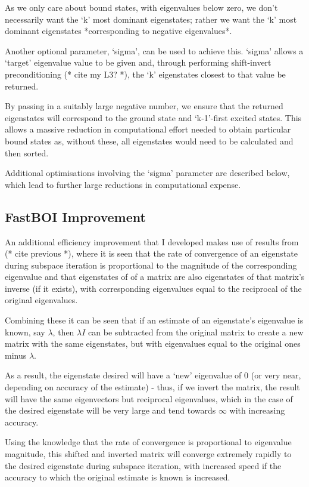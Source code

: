As we only care about bound states, with eigenvalues below zero, we don't necessarily want the `k' most dominant eigenstates; rather we want the `k' most dominant eigenstates *corresponding to negative eigenvalues*. 

Another optional parameter, `sigma', can be used to achieve this. `sigma' allows a `target' eigenvalue value to be given and, through performing shift-invert preconditioning (* cite my L3? *), the `k' eigenstates closest to that value be returned. 

By passing in a suitably large negative number, we ensure that the returned eigenstates will correspond to the ground state and `k-1'-first excited states. This allows a massive reduction in computational effort needed to obtain particular bound states as, without these, all eigenstates would need to be calculated and then sorted. 

Additional optimisations involving the `sigma' parameter are described below, which lead to further large reductions in computational expense.

\subsection{FastBOI Improvement}
An additional efficiency improvement that I developed makes use of results from (* cite previous *), where it is seen that the rate of convergence of an eigenstate during subspace iteration is proportional to the magnitude of the corresponding eigenvalue and that eigenstates of of a matrix are also eigenstates of that matrix's inverse (if it exists), with corresponding eigenvalues equal to the reciprocal of the original eigenvalues. 

Combining these it can be seen that if an estimate of an eigenstate's eigenvalue is known, say $\lambda$, then $\lambda I$ can be subtracted from the original matrix to create a new matrix with the same eigenstates, but with eigenvalues equal to the original ones minus $\lambda$. 

As a result, the eigenstate desired will have a `new' eigenvalue of $0$ (or very near, depending on accuracy of the estimate) - thus, if we invert the matrix, the result will have the same eigenvectors but reciprocal eigenvalues, which in the case of the desired eigenstate will be very large and tend towards $\infty$ with increasing accuracy. 

Using the knowledge that the rate of convergence is proportional to eigenvalue magnitude, this shifted and inverted matrix will converge extremely rapidly to the desired eigenstate during subspace iteration, with increased speed if the accuracy to which the original estimate is known is increased.

